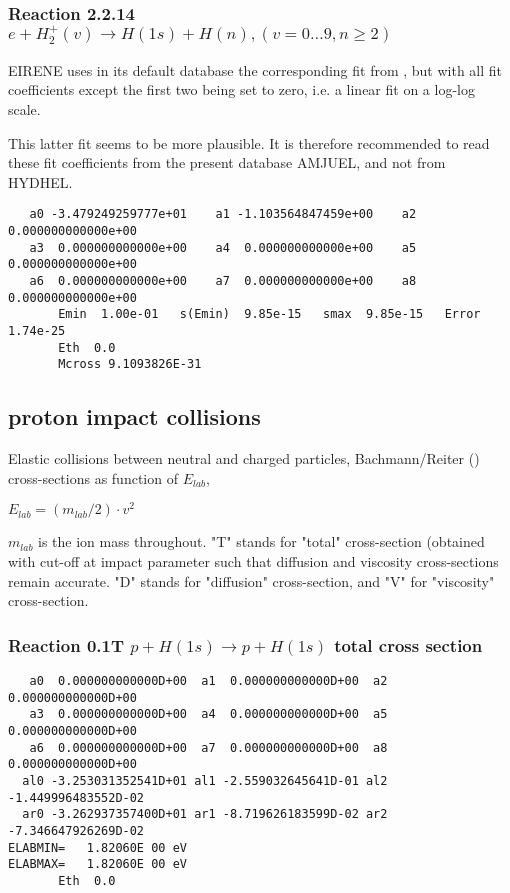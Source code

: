 \documentclass[12pt,dvipdfmx]{article}
\begin{document}
\subsubsection{
Reaction 2.2.14 $   e + H_2^+(v) \rightarrow H(1s) + H(n), (v=0\ldots 9, n\geq 2)$}


EIRENE uses in its default database the corresponding fit from \cite{kn:Janev},
but  with all fit coefficients except the first two being set to zero,
i.e. a linear fit on a log-log scale.

This latter fit seems to be more plausible.
It is therefore recommended to read these
fit coefficients from the present database AMJUEL, and not from HYDHEL.

\begin{small}\begin{verbatim}
   a0 -3.479249259777e+01    a1 -1.103564847459e+00    a2  0.000000000000e+00
   a3  0.000000000000e+00    a4  0.000000000000e+00    a5  0.000000000000e+00
   a6  0.000000000000e+00    a7  0.000000000000e+00    a8  0.000000000000e+00
       Emin  1.00e-01   s(Emin)  9.85e-15   smax  9.85e-15   Error  1.74e-25
       Eth  0.0
       Mcross 9.1093826E-31
\end{verbatim}\end{small}



\newpage

\subsection{proton impact collisions}\label{sect1.1}
\bigskip
Elastic collisions between neutral and charged particles,
Bachmann/Reiter (\cite{kn:Bachmann})
cross-sections as function of $E_{lab}$,

$E_{lab} = (m_{lab}/2) \cdot v^2$

$m_{lab}$ is the ion mass throughout.  "T" stands for "total" cross-section (obtained  with cut-off
at impact parameter such that diffusion and viscosity cross-sections remain accurate.
"D" stands for "diffusion" cross-section, and "V" for "viscosity" cross-section.

\subsubsection{
Reaction 0.1T $p + H(1s) \rightarrow p + H(1s) $ total cross
section}

\begin{small}\begin{verbatim}
   a0  0.000000000000D+00  a1  0.000000000000D+00  a2  0.000000000000D+00
   a3  0.000000000000D+00  a4  0.000000000000D+00  a5  0.000000000000D+00
   a6  0.000000000000D+00  a7  0.000000000000D+00  a8  0.000000000000D+00
  al0 -3.253031352541D+01 al1 -2.559032645641D-01 al2 -1.449996483552D-02
  ar0 -3.262937357400D+01 ar1 -8.719626183599D-02 ar2 -7.346647926269D-02
ELABMIN=   1.82060E 00 eV
ELABMAX=   1.82060E 00 eV
       Eth  0.0
\end{verbatim}\end{small}
\end{document}

